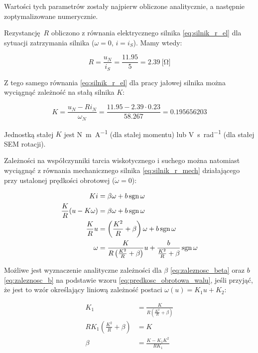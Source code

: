 Wartości tych parametrów zostały najpierw obliczone analitycznie, a następnie zoptymalizowane numerycznie.

Rezystancję $R$ obliczono z równania elektrycznego silnika \eqref{eq:silnik_r_el} dla sytuacji zatrzymania silnika ($\omega = 0$, $i = i_S$). Mamy wtedy:

\begin{equation}
    R = \frac{u_N}{i_S} = \frac{\num{11,95}}{\num{5}} = \SI{2,39}{[\ohm]}
\end{equation}

Z tego samego równania \eqref{eq:silnik_r_el} dla pracy jałowej silnika można wyciągnąć zależność na stałą silnika $K$:

\begin{equation}
    K = \frac{u_N - R i_N}{\omega_N} = \frac{\num{11,95} - \num{2,39} \cdot \num{0,23}}{\num{58,267}} = \num{0,195656203}
\end{equation}

Jednostką stałej $K$ jest \si{\newton\meter\per\ampere} (dla stałej momentu) lub \si{\volt\second\per\radian} (dla stałej SEM rotacji).

Zależności na współczynniki tarcia wiskotycznego i suchego można natomiast wyciągnąć z równania mechanicznego silnika \eqref{eq:silnik_r_mech} działającego przy ustalonej prędkości obrotowej ($\dot{\omega} = 0$):

\begin{align}
    K i &= \beta \omega + b \operatorname{sgn} \omega \nonumber \\
    \frac{K}{R} (u - K \omega) &= \beta \omega + b \operatorname{sgn} \omega \nonumber \\
    \frac{K}{R} u &= \left(\frac{K^2}{R} + \beta \right) \omega + b \operatorname{sgn} \omega \nonumber \\
    \omega &= \frac{K}{R \left(\frac{K^2}{R} + \beta \right)} u + \frac{b}{\frac{K^2}{R} + \beta} \operatorname{sgn} \omega \label{eq:predkosc_obrotowa_walu}
\end{align}

Możliwe jest wyznaczenie analityczne zależności dla $\beta$ \eqref{eq:zaleznosc_beta} oraz $b$ \eqref{eq:zaleznosc_b} na podstawie wzoru \eqref{eq:predkosc_obrotowa_walu}, jeśli przyjąć, że jest to wzór określający liniową zależność postaci $\omega(u) = K_1 u + K_2$:

\begin{align}
    K_1 &= \frac{K}{R \left(\frac{K^2}{R} + \beta \right)} \nonumber \\
    R K_1 \left(\frac{K^2}{R} + \beta \right) &= K \nonumber \\
    \beta &= \frac{K - K_1 K^2}{R K_1} \label{eq:zaleznosc_beta}
\end{align}

